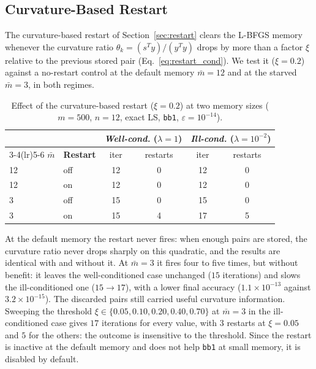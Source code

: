 \subsection{Curvature-Based Restart}
\label{sec:exp_restart}

\noindent The curvature-based restart of Section~\ref{sec:restart} clears the
L-BFGS memory whenever the curvature ratio $\theta_k = (s^Ty)/(y^Ty)$ drops by
more than a factor $\xi$ relative to the previous stored pair
(Eq.~\eqref{eq:restart_cond}). We test it ($\xi = 0.2$) against a no-restart
control at the default memory $\bar{m} = 12$ and at the starved
$\bar{m} = 3$, in both regimes.

\begin{table}[H]
\centering
\caption{Effect of the curvature-based restart ($\xi = 0.2$) at two memory
  sizes ($m = 500$, $n = 12$, exact LS, \texttt{bb1}, $\varepsilon = 10^{-14}$).}
\label{tab:restart_effect}
\small
\setlength{\tabcolsep}{9pt}
\begin{tabular}{llcccc}
    \toprule
    & & \multicolumn{2}{c}{\emph{Well-cond.} ($\lambda = 1$)}
      & \multicolumn{2}{c}{\emph{Ill-cond.} ($\lambda = 10^{-2}$)} \\
    \cmidrule(lr){3-4}\cmidrule(lr){5-6}
    $\bar{m}$ & \textbf{Restart} & iter & restarts & iter & restarts \\
    \midrule
    12 & off & 12 & 0 & 12 & 0 \\
    12 & on  & 12 & 0 & 12 & 0 \\
    3  & off & 15 & 0 & 15 & 0 \\
    3  & on  & 15 & 4 & 17 & 5 \\
    \bottomrule
\end{tabular}
\end{table}

\noindent At the default memory the restart never fires: when enough pairs are
stored, the curvature ratio never drops sharply on this quadratic, and the
results are identical with and without it. At $\bar{m} = 3$ it fires four to
five times, but without benefit: it leaves the well-conditioned case
unchanged ($15$ iterations) and slows the ill-conditioned one ($15 \to 17$),
with a lower final accuracy ($1.1 \times 10^{-13}$ against
$3.2 \times 10^{-15}$). The discarded pairs still carried useful curvature
information. Sweeping the threshold
$\xi \in \{0.05, 0.10, 0.20, 0.40, 0.70\}$ at $\bar{m} = 3$ in the
ill-conditioned case gives $17$ iterations for every value, with $3$ restarts
at $\xi = 0.05$ and $5$ for the others: the outcome is insensitive to the
threshold. Since the restart is inactive at the default memory and does not
help \texttt{bb1} at small memory, it is disabled by default.


